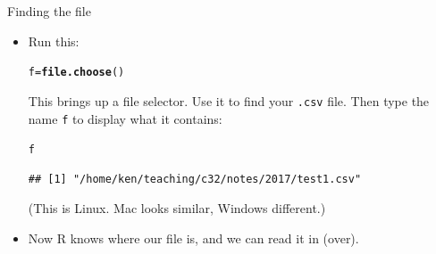 \documentclass[unknownkeysallowed]{beamer}\usepackage[]{graphicx}\usepackage[]{color}
\makeatletter
\newcommand{\hlstd}[1]{\textcolor[rgb]{0.345,0.345,0.345}{#1}}%
\newcommand{\hlkwb}[1]{\textcolor[rgb]{0.69,0.353,0.396}{#1}}%
\newcommand{\hlkwd}[1]{\textcolor[rgb]{0.737,0.353,0.396}{\textbf{#1}}}%
\newenvironment{kframe}{%
 \def\at@end@of@kframe{}%
 \ifinner\ifhmode%
  \def\at@end@of@kframe{\end{minipage}}%
  \begin{minipage}{\columnwidth}%
 \fi\fi%
 \def\FrameCommand##1{\hskip\@totalleftmargin \hskip-\fboxsep
 \colorbox{shadecolor}{##1}\hskip-\fboxsep
     \hskip-\linewidth \hskip-\@totalleftmargin \hskip\columnwidth}%
 \MakeFramed {\advance\hsize-\width
   \@totalleftmargin\z@ \linewidth\hsize
   \@setminipage}}%
 {\par\unskip\endMakeFramed%
 \at@end@of@kframe}
\newenvironment{knitrout}{}{} %
\makeatother
\begin{document}
\begin{frame}[fragile]{Finding the file}
  \begin{itemize}
\item Run this:
 

\begin{knitrout}
\color{fgcolor}\begin{kframe}
\begin{alltt}
\hlstd{f}\hlkwb{=}\hlkwd{file.choose}\hlstd{()}
\end{alltt}
\end{kframe}
\end{knitrout}

This brings up a file selector. Use it to find your \texttt{.csv}
file. Then type the name \texttt{f} to display what it contains:

\begin{knitrout}
\color{fgcolor}\begin{kframe}
\begin{alltt}
\hlstd{f}
\end{alltt}
\begin{verbatim}
## [1] "/home/ken/teaching/c32/notes/2017/test1.csv"
\end{verbatim}
\end{kframe}
\end{knitrout}

(This is Linux. Mac looks similar, Windows different.)

\item Now R knows where our file is, and we can read it in (over).
  \end{itemize}
\end{frame}
\end{document}
